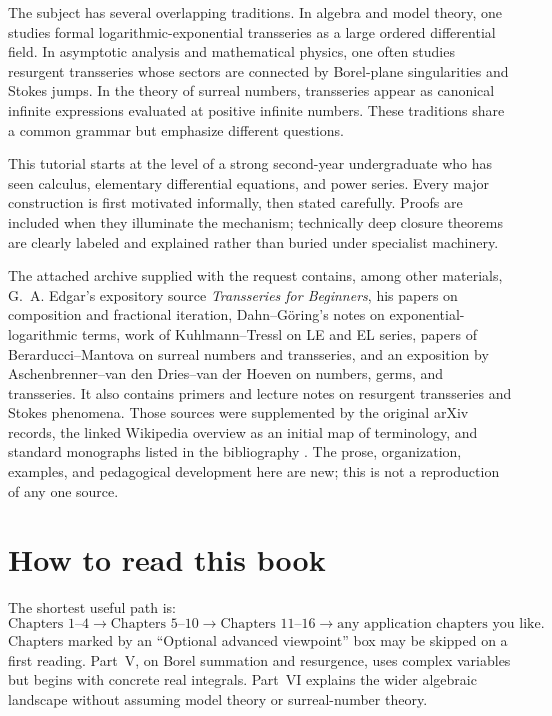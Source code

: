 \documentclass[11pt,openany]{book}
\theoremstyle{plain}
\theoremstyle{definition}
\theoremstyle{remark}
\begin{document}
The subject has several overlapping traditions. In algebra and model theory, one studies formal logarithmic-exponential transseries as a large ordered differential field. In asymptotic analysis and mathematical physics, one often studies resurgent transseries whose sectors are connected by Borel-plane singularities and Stokes jumps. In the theory of surreal numbers, transseries appear as canonical infinite expressions evaluated at positive infinite numbers. These traditions share a common grammar but emphasize different questions.

This tutorial starts at the level of a strong second-year undergraduate who has seen calculus, elementary differential equations, and power series. Every major construction is first motivated informally, then stated carefully. Proofs are included when they illuminate the mechanism; technically deep closure theorems are clearly labeled and explained rather than buried under specialist machinery.

\begin{sourcebox}
The attached archive supplied with the request contains, among other materials, G.~A. Edgar's expository source \emph{Transseries for Beginners}, his papers on composition and fractional iteration, Dahn--G\"oring's notes on exponential-logarithmic terms, work of Kuhlmann--Tressl on LE and EL series, papers of Berarducci--Mantova on surreal numbers and transseries, and an exposition by Aschenbrenner--van den Dries--van der Hoeven on numbers, germs, and transseries. It also contains primers and lecture notes on resurgent transseries and Stokes phenomena. Those sources were supplemented by the original arXiv records, the linked Wikipedia overview as an initial map of terminology, and standard monographs listed in the bibliography \cite{WikipediaTransseries}. The prose, organization, examples, and pedagogical development here are new; this is not a reproduction of any one source.
\end{sourcebox}

\section*{How to read this book}
The shortest useful path is:
\[
\text{Chapters 1--4}\longrightarrow
\text{Chapters 5--10}\longrightarrow
\text{Chapters 11--16}\longrightarrow
\text{any application chapters you like}.
\]
Chapters marked by an ``Optional advanced viewpoint'' box may be skipped on a first reading. Part~V, on Borel summation and resurgence, uses complex variables but begins with concrete real integrals. Part~VI explains the wider algebraic landscape without assuming model theory or surreal-number theory.
\end{document}

